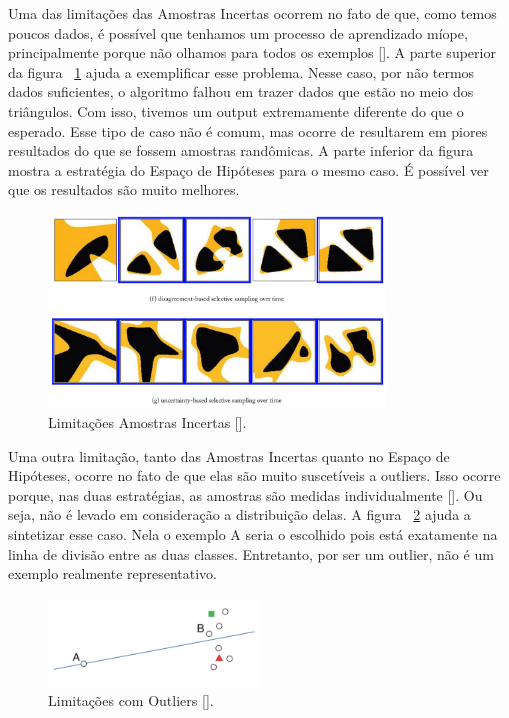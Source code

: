 Uma das limitações das Amostras Incertas ocorrem no fato de que, como temos poucos dados, é possível que tenhamos um processo de aprendizado míope, principalmente porque não olhamos para todos os exemplos [\cite{settles2014active}]. A parte superior da figura ~\ref{fig:limitations_incertas} ajuda a exemplificar esse problema. Nesse caso, por não termos dados suficientes, o algoritmo falhou em trazer dados que estão no meio dos triângulos. Com isso, tivemos um output extremamente diferente do que o esperado. Esse tipo de caso não é comum, mas ocorre de resultarem em piores resultados do que se fossem amostras randômicas. A parte inferior da figura mostra a estratégia do Espaço de Hipóteses para o mesmo caso. É possível ver que os resultados são muito melhores. 


\begin{figure}
  \centering
  \includegraphics[width=0.8\textwidth]{figures/limitations_incertas.png}
  \caption{Limitações Amostras Incertas [\cite{settles2014active}].}
  \label{fig:limitations_incertas}
\end{figure}

Uma outra limitação, tanto das Amostras Incertas quanto no Espaço de Hipóteses, ocorre no fato de que elas são muito suscetíveis a outliers. Isso ocorre porque, nas duas estratégias, as amostras são medidas individualmente [\cite{settles2014active}]. Ou seja, não é levado em consideração a distribuição delas. A figura ~\ref{fig:limitations_outliers} ajuda a sintetizar esse caso. Nela o exemplo A seria o escolhido pois está exatamente na linha de divisão entre as duas classes. Entretanto, por ser um outlier, não é um exemplo realmente representativo. 


\begin{figure}
  \centering
  \includegraphics[width=0.5\textwidth]{figures/limitations_outliers.png}
  \caption{Limitações com Outliers [\cite{settles2014active}].}
  \label{fig:limitations_outliers}
\end{figure}

